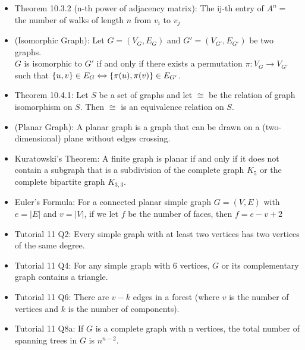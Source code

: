 \documentclass{article}
\begin{document}
\begin{itemize}
\begin{center}
        \end{center}
    \item Theorem 10.3.2 (n-th power of adjacency matrix): The ij-th entry of $A^n=$ the number of walks of length $n$ from $v_i$ to $v_j$ 
    \item (Isomorphic Graph): Let $G=(V_G, E_G)$ and $G'=(V_{G'}, E_{G'})$ be two graphs.
        \\ $G$ is isomorphic to $G'$ if and only if there exists a permutation $\pi: V_G \xrightarrow{} V_{G'}$ such that $\{u,v\}\in E_G \xleftrightarrow{} \{\pi (u),\pi(v)\}\in E_{G'}$.
    \item Theorem 10.4.1: Let $S$ be a set of graphs and let $\cong$ be the relation of graph isomorphism on $S$. Then $\cong$ is an equivalence relation on $S$.
    \item (Planar Graph): A planar graph is a graph that can be drawn on a (two-dimensional) plane without edges crossing.
    \item Kuratowski's Theorem: A finite graph is planar if and only if it does not contain a subgraph that is a subdivision of the complete graph $K_5$ or the complete bipartite graph $K_{3,3}$.
    \item Euler's Formula: For a connected planar simple graph $G=(V,E)$ with $e=|E|$ and $v=|V|$, if we let $f$ be the number of faces, then $f=e-v+2$
    \item Tutorial 11 Q2: Every simple graph with at least two vertices has two vertices of the same degree.
    \item Tutorial 11 Q4: For any simple graph with 6 vertices, $G$ or its complementary graph contains a triangle.
    \item Tutorial 11 Q6: There are $v - k$ edges in a forest (where $v$ is the number of vertices and $k$ is the number of components).
    \item Tutorial 11 Q8a: If $G$ is a complete graph with n vertices, the total number of spanning trees in $G$ is $n^{n-2}$.
\end{itemize}

\end{document}
